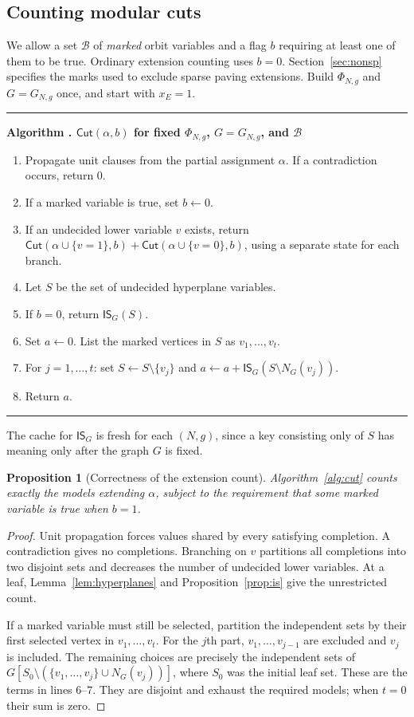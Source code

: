 \documentclass[11pt]{article}
\newtheorem{proposition}[theorem]{Proposition}
\theoremstyle{definition}
\newcounter{algorithm}
\newenvironment{algorithm}[1]{%
  \refstepcounter{algorithm}\par\medskip\noindent
  \begin{minipage}{\linewidth}\hrule\medskip
  \textbf{Algorithm \thealgorithm. #1}\par\smallskip
  \begin{enumerate}[label=\arabic*.,leftmargin=2.2em,itemsep=2pt,topsep=0pt]
}{\end{enumerate}\medskip\hrule\end{minipage}\par\medskip}
\newcommand{\IS}{\mathsf{IS}}
\newcommand{\Cut}{\mathsf{Cut}}
\begin{document}
\subsection{Counting modular cuts}

We allow a set $\mathcal B$ of \emph{marked} orbit variables and a flag $b$ requiring
at least one of them to be true. Ordinary extension counting uses $b=0$.
Section~\ref{sec:nonsp} specifies the marks used to exclude sparse paving
extensions. Build $\Phi_{N,g}$ and $G=G_{N,g}$ once, and start with $x_E=1$.

\begin{algorithm}{$\Cut(\alpha,b)$ for fixed $\Phi_{N,g}$, $G=G_{N,g}$, and $\mathcal B$}
\label{alg:cut}
\item Propagate unit clauses from the partial assignment $\alpha$.
      If a contradiction occurs, return $0$.
\item If a marked variable is true, set $b\gets0$.
\item If an undecided lower variable $v$ exists, return
      $\Cut(\alpha\cup\{v=1\},b)+\Cut(\alpha\cup\{v=0\},b)$,
      using a separate state for each branch.
\item Let $S$ be the set of undecided hyperplane variables.
\item If $b=0$, return $\IS_G(S)$.
\item Set $a\gets0$. List the marked vertices in $S$ as $v_1,\ldots,v_t$.
\item For $j=1,\ldots,t$:
      set $S\gets S\setminus\{v_j\}$ and
      $a\gets a+\IS_G(S\setminus N_G(v_j))$.
\item Return $a$.
\end{algorithm}

The cache for $\IS_G$ is fresh for each $(N,g)$, since a key consisting only
of $S$ has meaning only after the graph $G$ is fixed.

\begin{proposition}[Correctness of the extension count]\label{prop:cuts}
Algorithm~\ref{alg:cut} counts exactly the models extending $\alpha$, subject
to the requirement that some marked variable is true when $b=1$.
\end{proposition}
\begin{proof}
Unit propagation forces values shared by every satisfying completion.
A contradiction gives no completions. Branching on $v$ partitions all
completions into two disjoint sets and decreases the number of undecided
lower variables. At a leaf, Lemma~\ref{lem:hyperplanes} and
Proposition~\ref{prop:is} give the unrestricted count.

If a marked variable must still be selected, partition the independent sets
by their first selected vertex in $v_1,\ldots,v_t$. For the $j$th part,
$v_1,\ldots,v_{j-1}$ are excluded and $v_j$ is included. The remaining
choices are precisely the independent sets of
$G[S_0\setminus(\{v_1,\ldots,v_j\}\cup N_G(v_j))]$, where $S_0$ was the
initial leaf set. These are the terms in lines 6--7. They are disjoint
and exhaust the required models; when $t=0$ their sum is zero.
\end{proof}
\end{document}
